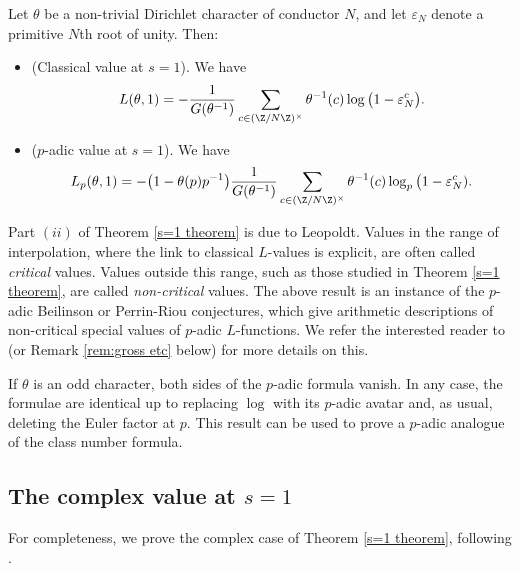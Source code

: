 \documentclass[a4paper,10pt, english, reqno]{smfart}
\numberwithin{equation}{section}
\begin{document}
\begin{theorem}\label{s=1 theorem} Let $\theta$ be a non-trivial Dirichlet character of conductor $N$, and let $\varepsilon_N$ denote a primitive $N$th root of unity. Then:
\begin{itemize}
\item[(i)] (Classical value at $s=1$). We have
\[L(\theta,1) = -\frac{1}{G(\theta^{-1})} \sum_{c \in (\Z/N\Z)^\times} \theta^{-1}(c) \log\big( 1-\varepsilon_N^c \big).\]
\item[(ii)] ($p$-adic value at $s=1$). We have
\[ L_p(\theta,1) = -\big( 1 - \theta(p) p^{-1} \big) \frac{1}{G(\theta^{-1})} 		\sum_{c \in (\Z/N\Z)^\times} \theta^{-1}(c) \log_p\big(1-\varepsilon_N^c).\]
\end{itemize}
\end{theorem}

 
\begin{remark}\label{rem:beilinson 1}
Part $(ii)$ of Theorem \ref{s=1 theorem} is due to Leopoldt. Values in the range of interpolation, where the link to classical $L$-values is explicit, are often called \emph{critical} values. Values outside this range, such as those studied in Theorem \ref{s=1 theorem}, are called \emph{non-critical} values. The above result is an instance of the $p$-adic Beilinson or Perrin-Riou conjectures, which give arithmetic descriptions of non-critical special values of $p$-adic $L$-functions. We refer the interested reader to \cite{PR} (or Remark \ref{rem:gross etc} below) for more details on this. 
\end{remark}


If $\theta$ is an odd character, both sides of the $p$-adic formula vanish. In any case, the formulae are identical up to replacing $\log$ with its $p$-adic avatar and, as usual, deleting the Euler factor at $p$. This result can be used to prove a $p$-adic analogue of the class number formula. 

\subsection{The complex value at $s = 1$}

For completeness, we prove the complex case of Theorem \ref{s=1 theorem}, following \cite[Thm.\ 4.9]{Washington2}.
\end{document}
